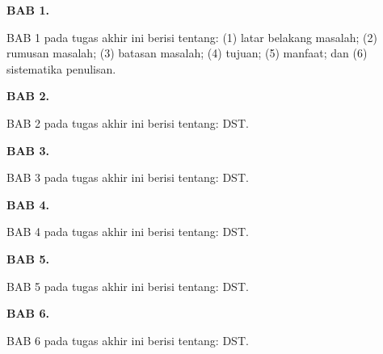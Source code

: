 \textbf{BAB 1. \babSatu}

BAB 1 pada tugas akhir ini berisi tentang: (1) latar belakang masalah; (2) rumusan masalah; (3) batasan masalah; (4) tujuan; (5) manfaat; dan (6) sistematika penulisan.

\textbf{BAB 2. \babDua}

BAB 2 pada tugas akhir ini berisi tentang: DST.


\textbf{BAB 3. \babTiga}

BAB 3 pada tugas akhir ini berisi tentang: DST.


\textbf{BAB 4. \babEmpat}

BAB 4 pada tugas akhir ini berisi tentang: DST.

\textbf{BAB 5. \babLima}

BAB 5 pada tugas akhir ini berisi tentang: DST.

\textbf{BAB 6. \babEnam}

BAB 6 pada tugas akhir ini berisi tentang: DST.